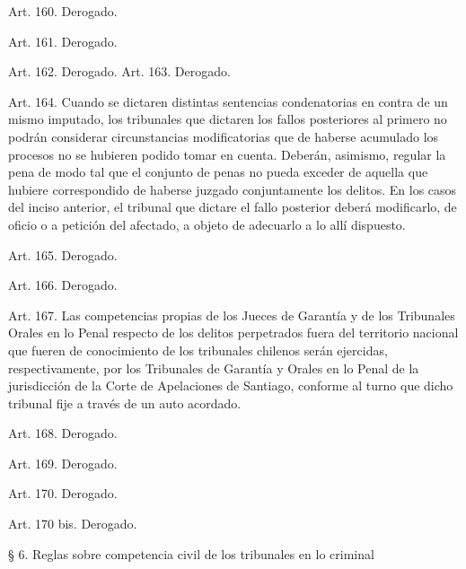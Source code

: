     Art. 160. Derogado.


    Art. 161. Derogado.


    Art. 162. Derogado.
    Art. 163. Derogado.



    Art. 164. Cuando se dictaren distintas sentencias condenatorias en contra de un mismo imputado, los tribunales que dictaren los fallos posteriores al primero no podrán considerar circunstancias modificatorias que de haberse acumulado los procesos no se hubieren podido tomar en cuenta. Deberán, asimismo, regular la pena de modo tal que el conjunto de penas no pueda exceder de aquella que hubiere correspondido de haberse juzgado conjuntamente los delitos.
    En los casos del inciso anterior, el tribunal que dictare el fallo posterior deberá modificarlo, de oficio o a petición del afectado, a objeto de adecuarlo a lo allí dispuesto.

    Art. 165. Derogado.


    Art. 166. Derogado.

    Art. 167. Las competencias propias de los Jueces de Garantía y de los Tribunales Orales en lo Penal respecto de los delitos perpetrados fuera del territorio nacional que fueren de conocimiento de los tribunales chilenos serán ejercidas, respectivamente, por los Tribunales de Garantía y Orales en lo Penal de la jurisdicción de la Corte de Apelaciones de Santiago, conforme al turno que dicho tribunal fije a través de un auto acordado.

    Art. 168. Derogado.



    Art. 169. Derogado.


    Art. 170. Derogado.


    Art. 170 bis. Derogado.



    § 6. Reglas sobre competencia civil de los tribunales en lo criminal


